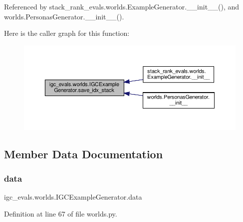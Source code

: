 Referenced by stack\+\_\+rank\+\_\+evals.\+worlds.\+Example\+Generator.\+\_\+\+\_\+init\+\_\+\+\_\+(), and worlds.\+Personas\+Generator.\+\_\+\+\_\+init\+\_\+\+\_\+().

Here is the caller graph for this function\+:
\nopagebreak
\begin{figure}[H]
\begin{center}
\leavevmode
\includegraphics[width=350pt]{classigc__evals_1_1worlds_1_1IGCExampleGenerator_a3f787da040d9b83d9c857b8ef65d36eb_icgraph}
\end{center}
\end{figure}


\subsection{Member Data Documentation}
\mbox{\label{classigc__evals_1_1worlds_1_1IGCExampleGenerator_ab21dfe02e8b60d4e37e25b8d942c4b61}} 
\subsubsection{\texorpdfstring{data}{data}}
{\footnotesize\ttfamily igc\+\_\+evals.\+worlds.\+I\+G\+C\+Example\+Generator.\+data}



Definition at line 67 of file worlds.\+py.



